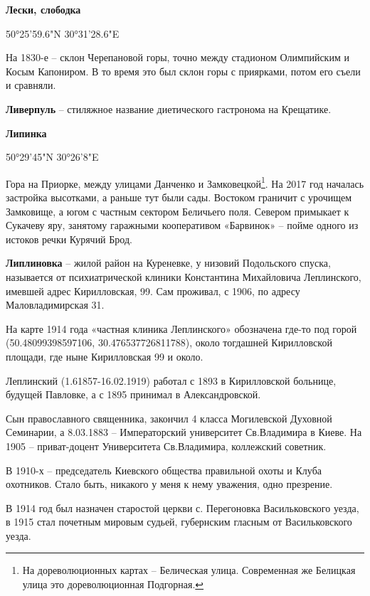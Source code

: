 \medskip

\textbf{Лески, слободка}

50°25'59.6"N 30°31'28.6"E

На 1830-е – склон Черепановой горы, точно между стадионом Олимпийским и Косым Капониром. В то время это был склон горы с приярками, потом его съели и сравняли.\\


\medskip


\textbf{Ливерпуль} – стиляжное название диетического гастронома на Крещатике.\\


\medskip


\textbf{Липинка}

50°29'45"N 30°26'8"E

Гора на Приорке, между улицами Данченко и Замковецкой\footnote{На дореволюционных картах – Белическая улица. Современная же Белицкая улица это дореволюционная Подгорная.}. На 2017 год началась застройка высотками, а раньше тут были сады. Востоком граничит с урочищем Замковище, а югом с частным сектором Беличьего поля. Севером примыкает к Сукачеву яру, занятому гаражными кооперативом «Барвинок» – пойме одного из истоков речки Курячий Брод.\\

\medskip


\textbf{Липлиновка} – жилой район на Куреневке, у низовий Подольского спуска, называется от психиатрической клиники Константина Михайловича Леплинского, имевшей адрес Кирилловская, 99. Сам проживал, с 1906, по адресу Маловладимирская 31.

На карте 1914 года «частная клиника Леплинского» обозначена где-то под горой (50.48099398597106, 30.476537726811788), около тогдашней Кирилловской площади, где ныне Кирилловская 99 и около.

Леплинский (1.61857-16.02.1919) работал с 1893 в Кирилловской больнице, будущей Павловке, а с 1895 принимал в Александровской.
 
Сын православного священника, закончил 4 класса Могилевской Духовной Семинарии, а 8.03.1883 – Императорский университет Св.Владимира в Киеве. На 1905 – приват-доцент Университета Св.Владимира, коллежский советник. 

В 1910-х – председатель Киевского общества правильной охоты и Клуба охотников. Стало быть, никакого у меня к нему уважения, одно презрение.

В 1914 год был назначен старостой церкви с. Перегоновка Васильковского уезда, в 1915 стал почетным мировым судьей, губернским гласным от Васильковского уезда.

